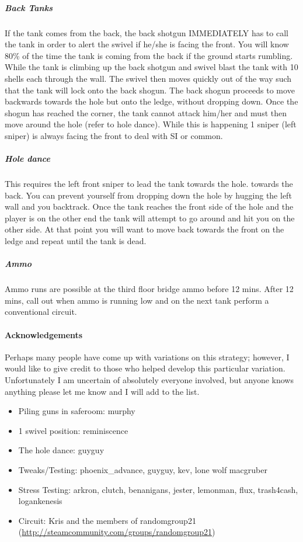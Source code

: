 \subparagraph{Back Tanks}
If the tank comes from the back, the back shotgun IMMEDIATELY has to call the tank in order to alert the swivel if he/she is facing the front. You will know 80\% of the time the tank is coming from the back if the ground starts rumbling. While the tank is climbing up the back shotgun and swivel blast the tank with 10 shells each through the wall. The swivel then moves quickly out of the way such that the tank will lock onto the back shogun. The back shogun proceeds to move backwards towards the hole but onto the ledge, without dropping down. Once the shogun has reached the corner, the tank cannot attack him/her and must then move around the hole (refer to hole dance). While this is happening 1 sniper (left sniper) is always facing the front to deal with SI or common.

\subparagraph{Hole dance}
This requires the left front sniper to lead the tank towards the hole. towards the back. You can prevent yourself from dropping down the hole by hugging the left wall and you backtrack. Once the tank reaches the front side of the hole and the player is on the other end the tank will attempt to go around and hit you on the other side. At that point you will want to move back towards the front on the ledge and repeat until the tank is dead.

\subparagraph{Ammo}
Ammo runs are possible at the third floor bridge ammo before 12 mins.
After 12 mins, call out when ammo is running low and on the next tank perform a conventional circuit.

\paragraph{Acknowledgements}
Perhaps many people have come up with variations on this strategy; however, I would like to give credit to those who helped develop this particular variation. Unfortunately I am uncertain of absolutely everyone involved, but anyone knows anything please let me know and I will add to the list.

\begin{itemize}
\item Piling guns in saferoom: murphy
\item 1 swivel position: reminiscence
\item The hole dance: guyguy
\item Tweaks/Testing: phoenix\_advance, guyguy, kev, lone wolf macgruber
\item Stress Testing: arkron, clutch, benanigans, jester, lemonman, flux, trash4cash, logankenesis
\item Circuit: Kris and the members of randomgroup21 (\url{http://steamcommunity.com/groups/randomgroup21})
\end{itemize}


